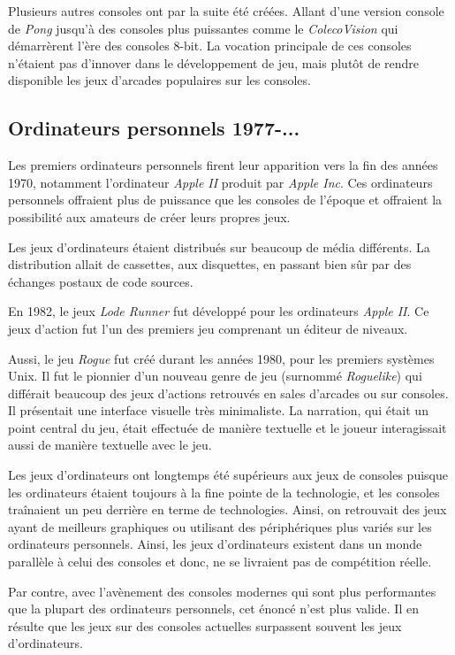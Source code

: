 \documentclass[12pt,oneside,letterpaper,francais]{book}
\newcommand{\lr}{{\textit{Lode Runner }}}
\begin{document}
Plusieurs autres consoles ont par la suite été créées. Allant d'une
version console de \textit{Pong} jusqu'à des consoles plus puissantes
comme le \textit{ColecoVision} qui démarrèrent l'ère des consoles
8-bit. La vocation principale de ces consoles n'étaient pas d'innover
dans le développement de jeu, mais plutôt de rendre disponible les
jeux d'arcades populaires sur les consoles.

\subsection{Ordinateurs personnels 1977-...}
Les premiers ordinateurs personnels firent leur apparition vers la
fin des années 1970, notamment l'ordinateur \textit{Apple II}
produit par \textit{Apple Inc}. Ces ordinateurs personnels offraient
plus de puissance que les consoles de l'époque et offraient la
possibilité aux amateurs de créer leurs propres jeux.

Les jeux d'ordinateurs étaient distribués sur beaucoup de média
différents. La distribution allait de cassettes, aux disquettes, en
passant bien sûr par des échanges postaux de code sources.

En 1982, le jeux \lr fut développé pour les
ordinateurs \textit{Apple II}. Ce jeux d'action fut l'un des premiers
jeu comprenant un éditeur de niveaux.

Aussi, le jeu \textit{Rogue} fut créé durant les années 1980, pour les
premiers systèmes Unix. Il fut le pionnier d'un nouveau genre de jeu
(surnommé \textit{Roguelike}) qui différait beaucoup des jeux
d'actions retrouvés en sales d'arcades ou sur consoles. Il présentait
une interface visuelle très minimaliste. La narration, qui était un
point central du jeu, était effectuée de manière textuelle et le
joueur interagissait aussi de manière textuelle avec le jeu.

Les jeux d'ordinateurs ont longtemps été supérieurs aux jeux de
consoles puisque les ordinateurs étaient toujours à la fine pointe de
la technologie, et les consoles traînaient un peu derrière en terme de
technologies. Ainsi, on retrouvait des jeux ayant de meilleurs
graphiques ou utilisant des périphériques plus variés sur les
ordinateurs personnels. Ainsi, les jeux d'ordinateurs existent dans un
monde parallèle à celui des consoles et donc, ne se livraient pas de
compétition réelle.

Par contre, avec l'avènement des consoles modernes qui sont plus
performantes que la plupart des ordinateurs personnels, cet énoncé
n'est plus valide. Il en résulte que les jeux sur des consoles
actuelles surpassent souvent les jeux d'ordinateurs.
\end{document}
